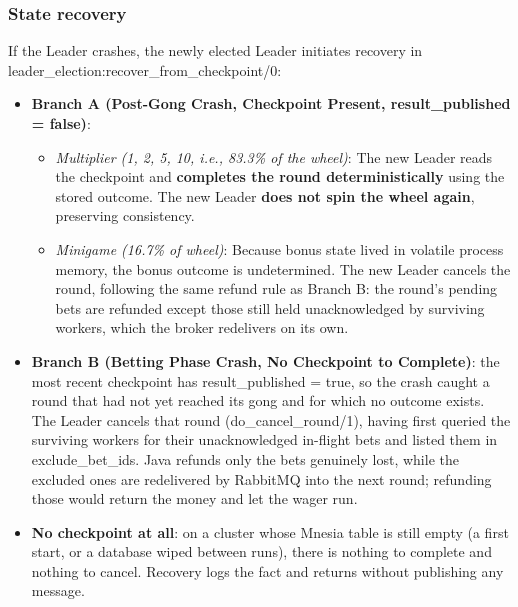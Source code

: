 \documentclass[12pt,a4paper]{article}
\begin{document}
\subsubsection{State recovery}
If the Leader crashes, the newly elected Leader initiates recovery in leader\_\allowbreak election:recover\_\allowbreak from\_\allowbreak checkpoint/0:
\begin{itemize}
    \item \textbf{Branch A (Post-Gong Crash, Checkpoint Present, result\_\allowbreak published = false)}:
    \begin{itemize}
        \item \textit{Multiplier (1, 2, 5, 10, i.e., 83.3\% of the wheel)}: The new Leader reads the checkpoint and \textbf{completes the round deterministically} using the stored outcome. The new Leader \textbf{does not spin the wheel again}, preserving consistency.
        \item \textit{Minigame (16.7\% of wheel)}: Because bonus state lived in volatile process memory, the bonus outcome is undetermined. The new Leader cancels the round, following the same refund rule as Branch B: the round's pending bets are refunded except those still held unacknowledged by surviving workers, which the broker redelivers on its own.
    \end{itemize}
    \item \textbf{Branch B (Betting Phase Crash, No Checkpoint to Complete)}: the most recent checkpoint has result\_\allowbreak published = true, so the crash caught a round that had not yet reached its gong and for which no outcome exists. The Leader cancels that round (do\_\allowbreak cancel\_\allowbreak round/1), having first queried the surviving workers for their unacknowledged in-flight bets and listed them in exclude\_\allowbreak bet\_\allowbreak ids. Java refunds only the bets genuinely lost, while the excluded ones are redelivered by RabbitMQ into the next round; refunding those would return the money and let the wager run.
    \item \textbf{No checkpoint at all}: on a cluster whose Mnesia table is still empty (a first start, or a database wiped between runs), there is nothing to complete and nothing to cancel. Recovery logs the fact and returns without publishing any message.
\end{itemize}
\end{document}
